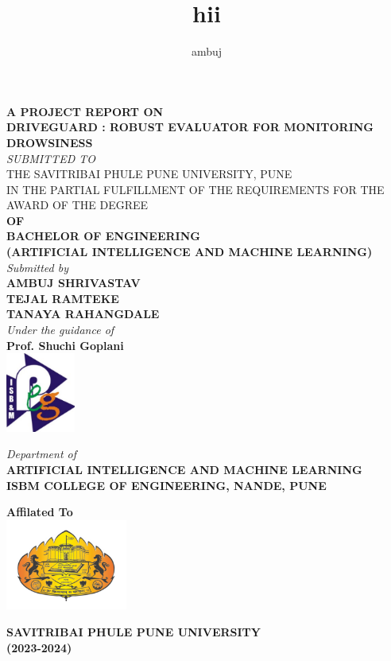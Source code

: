 \documentclass[12pt]{article}
\title{hii}
\author{ambuj}
\begin{document}
\begin{titlepage}
\begin{center}

            
   \small
   \textbf{A PROJECT REPORT ON}\\ 
\vspace{0.5cm}
\large\textbf{DRIVEGUARD : ROBUST EVALUATOR FOR MONITORING DROWSINESS}\\\small
\vspace{0.5cm}
\textit{SUBMITTED TO}\\ 
\textnormal{THE SAVITRIBAI PHULE PUNE UNIVERSITY, PUNE\\ IN THE PARTIAL FULFILLMENT OF THE REQUIREMENTS FOR THE  AWARD OF THE DEGREE }\\
\vspace{0.4cm}
\textbf{OF}\\
\vspace{0.4cm}
\textbf{BACHELOR OF ENGINEERING\\ (ARTIFICIAL INTELLIGENCE AND MACHINE LEARNING)}\\
\vspace{0.3cm}
\textit{Submitted by}\\
\vspace{0.3cm}
\small
\textbf{AMBUJ SHRIVASTAV}\\
\textbf{TEJAL RAMTEKE}\\
\textbf{TANAYA RAHANGDALE}\\
\vspace{0.3cm}
\textit{Under the guidance of }\\
\textbf{Prof.  Shuchi Goplani }\\
   \vspace{0.8 cm}
\includegraphics[width=0.17\textwidth]{logo}
 \vspace{0.8 cm}

\textit{Department of }\\ \textbf{ARTIFICIAL INTELLIGENCE AND MACHINE LEARNING}\\
\textbf{ISBM COLLEGE OF ENGINEERING, NANDE, PUNE }

  \vspace{0.4cm}
\textbf{Affilated To}\\
 \vspace{0.4cm}
\includegraphics[width=0.3\textwidth]{sppulogo}
 \vspace{0.4cm}

 \textbf{SAVITRIBAI PHULE PUNE UNIVERSITY \\(2023-2024)}
     
 \end{center}
\end{titlepage}
\end{document}
